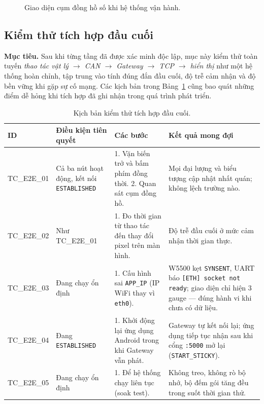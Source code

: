 \documentclass[../DoAn.tex]{subfiles}
\begin{document}
\begin{figure}[H]
  \centering
  \caption{Giao diện cụm đồng hồ số khi hệ thống vận hành.}
  \label{fig:cluster-ui}
\end{figure}

\subsection{Kiểm thử tích hợp đầu cuối}
\label{section:4.4.4}

\textbf{Mục tiêu.} Sau khi từng tầng đã được xác minh độc lập, mục này kiểm thử
toàn tuyến \textit{thao tác vật lý $\to$ CAN $\to$ Gateway $\to$ TCP $\to$ hiển
thị} như một hệ thống hoàn chỉnh, tập trung vào tính đúng đắn đầu cuối, độ trễ
cảm nhận và độ bền vững khi gặp sự cố mạng. Các kịch bản trong
Bảng~\ref{tab:tc-e2e} cũng bao quát những điểm dễ hỏng khi tích hợp đã ghi nhận
trong quá trình phát triển.

\begin{table}[H]
  \centering
  \caption{Kịch bản kiểm thử tích hợp đầu cuối.}
  \label{tab:tc-e2e}
  \begin{tabular}{@{}p{1.7cm}p{2.6cm}p{4.2cm}p{4.2cm}@{}}
    \toprule
    \textbf{ID} & \textbf{Điều kiện tiên quyết} & \textbf{Các bước} & \textbf{Kết quả mong đợi} \\
    \midrule
    TC\_E2E\_01 & Cả ba nút hoạt động, kết nối \texttt{ESTABLISHED} & 1. Vặn biến
      trở và bấm phím đồng thời. 2. Quan sát cụm đồng hồ. & Mọi đại lượng và biểu
      tượng cập nhật nhất quán; không lệch trường nào. \\
    TC\_E2E\_02 & Như TC\_E2E\_01 & 1. Đo thời gian từ thao tác đến thay đổi pixel
      trên màn hình. & Độ trễ đầu cuối ở mức cảm nhận thời gian thực.
      \\
    TC\_E2E\_03 & Đang chạy ổn định & 1. Cấu hình sai \texttt{APP\_IP} (IP WiFi
      thay vì \texttt{eth0}). & W5500 kẹt \texttt{SYNSENT}, UART báo
      \texttt{[ETH] socket not ready}; giao diện chỉ hiện 3 gauge — đúng hành vi
      khi chưa có dữ liệu. \\
    TC\_E2E\_04 & Đang \texttt{ESTABLISHED} & 1. Khởi động lại ứng dụng Android
      trong khi Gateway vẫn phát. & Gateway tự kết nối lại; ứng dụng tiếp tục
      nhận sau khi cổng \texttt{:5000} mở lại (\texttt{START\_STICKY}). \\
    TC\_E2E\_05 & Đang chạy ổn định & 1. Để hệ thống chạy liên tục (soak test). &
      Không treo, không rò bộ nhớ, bộ đếm gói tăng đều trong suốt thời gian thử.
      \\
    \bottomrule
  \end{tabular}
\end{table}
\end{document}
